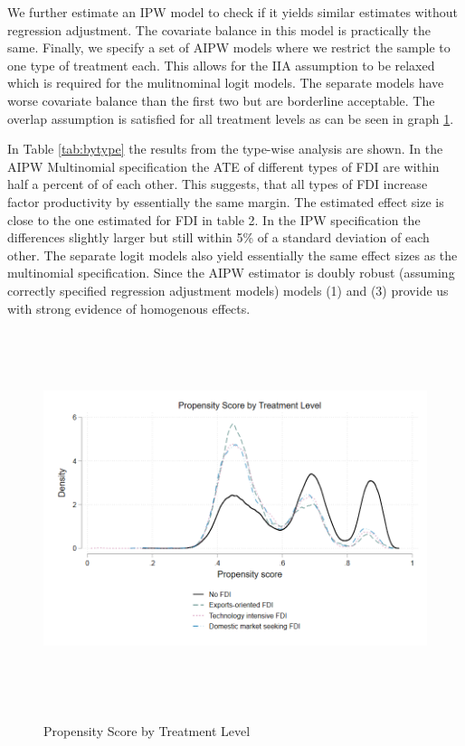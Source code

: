 \documentclass[a4paper,11pt]{scrartcl}
\begin{document}
We further estimate an IPW model to check if it yields similar estimates without regression adjustment. The covariate balance in this model is practically the same. Finally, we specify a set of AIPW models where we restrict the sample to one type of treatment each. This allows for the IIA assumption to be relaxed which is required for the mulitnominal logit models. The separate models have worse covariate balance than the first two but are borderline acceptable. The overlap assumption is satisfied for all treatment levels as can be seen in graph \ref{fig:psbytype}. 


In Table \ref{tab:bytype} the results from the type-wise analysis are shown. In the AIPW Multinomial specification the ATE of different types of FDI are within half a percent of of each other. This suggests, that all types of FDI increase factor productivity by essentially the same margin. The estimated effect size is close to the one estimated for FDI in table 2. In the IPW specification the differences slightly larger but still within 5\% of a standard deviation of each other.  The separate logit models also yield essentially the same effect sizes as the multinomial specification. Since the AIPW estimator is doubly robust (assuming correctly specified regression adjustment models) models (1) and (3) provide us with strong evidence of homogenous effects.


\begin{figure}[h]\centering
\caption{Propensity Score by Treatment Level}
\includegraphics[height=11cm]{mlog_overl_ppb.png}\\[0.5cm] 
\label{fig:psbytype}
\end{figure}
\end{document}
